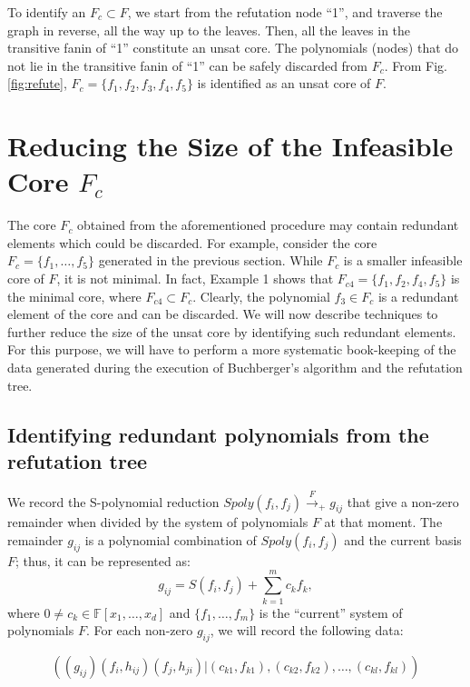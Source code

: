 To identify an $F_c \subset F$, we start from the refutation node
``1'', and traverse the graph in reverse, all the way up to the
leaves. Then, all the leaves in the transitive fanin of ``1''
constitute an unsat core. The polynomials (nodes) that do not lie in
the transitive fanin of ``1'' can be safely discarded from $F_c$. From
Fig. \ref{fig:refute}, $F_c = \{f_1,f_2,f_3,f_4,f_5\}$ is identified
as an unsat core of $F$. 

\section{Reducing the Size of the Infeasible Core $F_c$}
\label{sec:alg}
The core $F_c$ obtained from the aforementioned procedure may
contain redundant elements which could be discarded. For
example, consider the core $F_c=\{f_1,\dots, f_5\}$ generated in the
previous section. While $F_c$ is a smaller infeasible core of $F$, it
is not minimal. In fact, Example 1 shows that $F_{c4} =\{f_1,f_2,f_4,f_5\}$ is the
minimal core, where $F_{c4} \subset F_{c}$. Clearly, the polynomial
$f_3 \in F_c$ is a redundant element of the core and can be 
discarded. We will now describe techniques to further reduce the size
of the unsat core by identifying such redundant elements. 
For this purpose, we will have to perform a more 
systematic book-keeping of the data generated during the execution of
Buchberger's algorithm and the refutation tree. 

\subsection{Identifying redundant polynomials from the refutation tree}

We record the S-polynomial reduction
$Spoly(f_i,f_j)\xrightarrow{F}_+{g_{ij}}$ that give a non-zero
remainder when divided by the system of polynomials $F$ at that
moment. The remainder $g_{ij}$ is a polynomial combination of
$Spoly(f_i,f_j)$ and the current basis $F$; thus, it can be
represented as:
\begin{equation}
\label{eqn1}
g_{ij}= S(f_i,f_j)+\displaystyle\sum_{k=1}^m c_kf_k,
\end{equation}
where $0\neq c_k\in\mathbb{F}[x_1,\ldots,x_d]$ and
$\{f_1,\ldots,f_m\}$ is the ``current'' system of polynomials
$F$. For each non-zero $g_{ij}$, we will record the following data: 

\begin{equation}
\label{data1}
((g_{ij})(f_{i},h_{ij})(f_{j},h_{ji})| (c_{k1},f_{k1}),(c_{k2},f_{k2}),\dots,(c_{kl},f_{kl}))
\end{equation}

